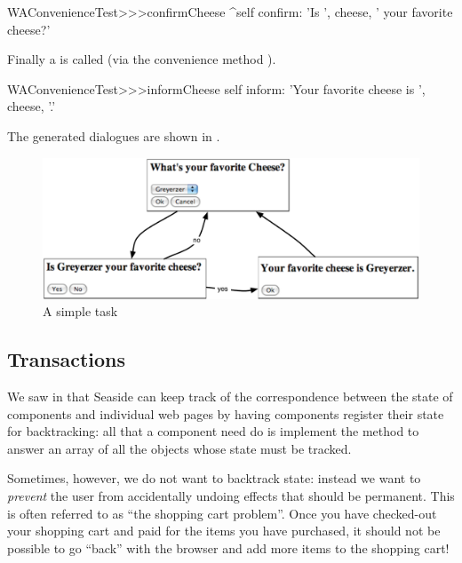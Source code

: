 \documentclass[a4paper,10pt,twoside]{book}
\begin{document}
\begin{code}{}
WAConvenienceTest>>>confirmCheese
	^self confirm: 'Is ', cheese,  ' your favorite cheese?'
\end{code}

Finally a  is called (via the convenience method ).

\begin{code}{}
WAConvenienceTest>>>informCheese
	self inform: 'Your favorite cheese is ', cheese, '.'
\end{code}

The generated dialogues are shown in .

\begin{figure}[ht]
\begin{center}
\includegraphics[width=\textwidth]{chooseCheese}
\caption{A simple task}
\end{center}
\end{figure}

\subsection{Transactions}

We saw in  that Seaside can keep track of the correspondence between the state of components and individual web pages by having components register their state for backtracking:
all that a component need do is implement the method  to answer an array of all the objects whose state must be tracked.

Sometimes, however, we do not want to backtrack state: instead we want to \emph{prevent} the user from accidentally undoing effects that should be permanent.
This is often referred to as ``the shopping cart problem''.
Once you have checked-out your shopping cart and paid for the items you have purchased, it should not be possible to go ``back'' with the browser and add more items to the shopping cart!
\end{document}
